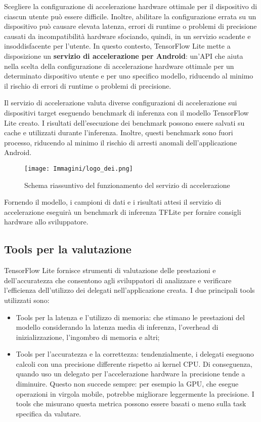 Scegliere la configurazione di accelerazione hardware ottimale per il dispositivo di ciascun utente può essere difficile. Inoltre, abilitare la
configurazione errata su un dispositivo può causare elevata latenza, errori di runtime o problemi di precisione causati da incompatibilità hardware
sfociando, quindi, in un servizio scadente e insoddisfacente per l’utente. In questo contesto, TensorFlow Lite mette a disposizione un \textbf{servizio di
accelerazione per Android}: un'API che aiuta nella scelta della configurazione di accelerazione hardware ottimale per un determinato dispositivo utente e
per uno specifico modello, riducendo al minimo il rischio di errori di runtime o problemi di precisione.

Il servizio di accelerazione valuta diverse configurazioni di accelerazione sui dispositivi target eseguendo benchmark di inferenza con il modello
TensorFlow Lite creato. I risultati dell’esecuzione dei benchmark possono essere salvati su cache e utilizzati durante l’inferenza. Inoltre, questi
benchmark sono fuori processo, riducendo al minimo il rischio di arresti anomali dell’applicazione Android.

\begin{figure}
    \centering
    \texttt{[image: Immagini/logo\_dei.png]}
    \caption{Schema riassuntivo del funzionamento del servizio di accelerazione}
    \label{fig:accelerazione}
\end{figure}

Fornendo il  modello, i campioni di dati e i risultati attesi il servizio di accelerazione eseguirà un benchmark di inferenza TFLite per fornire
consigli hardware allo sviluppatore.

\subsection{Tools per la valutazione}
TensorFlow Lite fornisce strumenti di valutazione delle prestazioni e dell’accuratezza che consentono agli sviluppatori di analizzare e verificare
l’efficienza dell’utilizzo dei delegati nell’applicazione creata. I due principali tools utilizzati sono:
\begin{itemize}
    \item Tools per la latenza e l’utilizzo di memoria: che stimano le prestazioni del modello considerando la latenza media di inferenza,
    l’overhead di inizializzazione, l’ingombro di memoria e altri;
    \item Tools per l’accuratezza e la correttezza: tendenzialmente, i delegati eseguono calcoli con una precisione differente rispetto ai kernel CPU.
    Di conseguenza, quando uso un delegato per l’accelerazione hardware la precisione tende a diminuire. Questo non succede sempre: per esempio la GPU,
    che esegue operazioni in virgola mobile, potrebbe migliorare leggermente la precisione. I tools che misurano questa metrica possono essere basati o
    meno sulla task specifica da valutare.
\end{itemize}